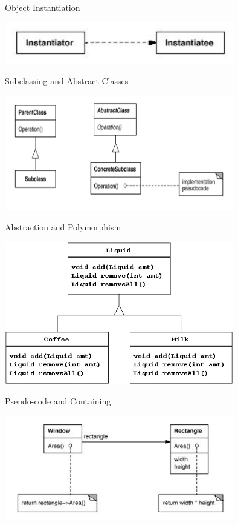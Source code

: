\begin{frame}{Object Instantiation}
	\begin{center}
		\includegraphics[width=10cm]{instance_diagram.jpg}
	\end{center}
\end{frame}

\begin{frame}{Subclassing and Abstract Classes}
	\begin{center}
		\includegraphics[width=10cm]{subclasses_and_abstraction.jpg}
	\end{center}
\end{frame}

\begin{frame}{Abstraction and Polymorphism}
	\begin{center}
		\includegraphics[width=10cm]{LiquidFamilyUML.jpg}
	\end{center}
\end{frame}

\begin{frame}{Pseudo-code and Containing}
	\begin{center}
		\includegraphics[width=10cm]{pseudocode_and_containment.jpg}
	\end{center}
\end{frame}

